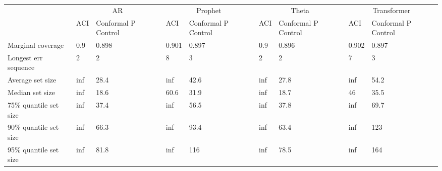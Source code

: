 \begin{tabular}{lllllllll}
\toprule
& \multicolumn{2}{c}{AR}& \multicolumn{2}{c}{Prophet}& \multicolumn{2}{c}{Theta}& \multicolumn{2}{c}{Transformer} \\
& ACI & Conformal P Control & ACI & Conformal P Control & ACI & Conformal P Control & ACI & Conformal P Control \\
\midrule
Marginal coverage & 0.9 & 0.898 & 0.901 & 0.897 & 0.9 & 0.896 & 0.902 & 0.897 \\
Longest err sequence & 2 & 2 & 8 & 3 & 2 & 2 & 7 & 3 \\
Average set size & inf & 28.4 & inf & 42.6 & inf & 27.8 & inf & 54.2 \\
Median set size & inf & 18.6 & 60.6 & 31.9 & inf & 18.7 & 46 & 35.5 \\
75\% quantile set size & inf & 37.4 & inf & 56.5 & inf & 37.8 & inf & 69.7 \\
90\% quantile set size & inf & 66.3 & inf & 93.4 & inf & 63.4 & inf & 123 \\
95\% quantile set size & inf & 81.8 & inf & 116 & inf & 78.5 & inf & 164 \\
\bottomrule
\end{tabular}

